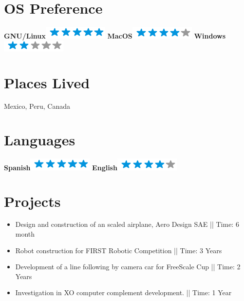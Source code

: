 \documentclass[]{friggeri-cv}
\begin{document}
\begin{aside}
~
~
~
  \section{OS Preference}
    \textbf{GNU/Linux}\includegraphics[scale=0.40]{img/5stars.png}
    \textbf{MacOS}\includegraphics[scale=0.40]{img/4stars.png}
    \textbf{Windows}\includegraphics[scale=0.40]{img/2stars.png}
    ~
  \section{Places Lived}
    {Mexico, Peru, Canada}
    ~
  \section{Languages}
    \textbf{Spanish}\includegraphics[scale=0.40]{img/5stars.png}
    \textbf{English}\includegraphics[scale=0.40]{img/4stars.png}
    ~
\end{aside}

\section{Projects}
    \begin{itemize}
    \addtolength{\itemindent}{-4mm}    
      \item Design and construction of an scaled airplane, Aero Design SAE || Time: 6 month\vspace{1mm}
      \item Robot construction for FIRST Robotic Competition || Time: 3 Years\vspace{1mm}
      \item Development of a line following by camera car for FreeScale Cup || Time: 2 Years\vspace{1mm}
      \item Investigation in XO computer complement development. || Time: 1 Year\vspace{1mm}

    \end{itemize}
\end{document}
